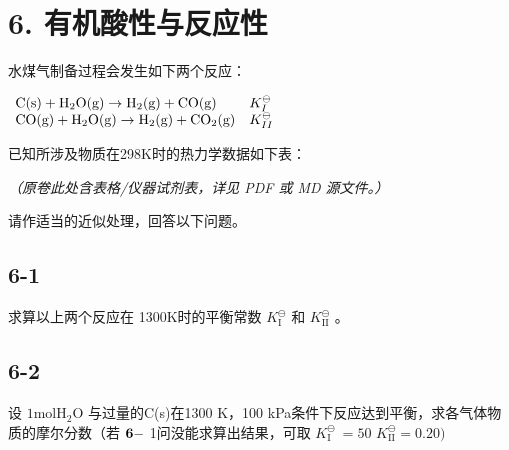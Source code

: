 \section*{6. 有机酸性与反应性}
⽔煤⽓制备过程会发⽣如下两个反应：

$
\begin{array}{l l}\mathrm {C(s)+ H_ {2} O(g)\rightarrow H_ {2} (g) + CO(g)}&K _ {I} ^ {\ominus}\\\mathrm {CO(g)+ H_ {2} O(g)\rightarrow H_ {2} (g) + CO_ {2} (g)}&K _ {I I} ^ {\ominus}\end{array}
$

已知所涉及物质在298K时的热⼒学数据如下表：

\textit{（原卷此处含表格/仪器试剂表，详见 PDF 或 MD 源文件。）}

请作适当的近似处理，回答以下问题。

\subsection*{6-1}
求算以上两个反应在 1300K时的平衡常数 $K _ { \mathrm { I } } ^ { \ominus }$ 和 $K _ { \mathrm { I I } } ^ { \ominus }$ 。

\subsection*{6-2}
设 $\mathrm { 1 m o l H _ { 2 } O }$ 与过量的C(s)在1300 K，100 kPa条件下反应达到平衡，求各⽓体物质的摩尔分数（若 ${ \bf 6 - }$ 1问没能求算出结果，可取 $K _ { \mathrm { I } } ^ { \ominus } \ = 5 0$ $K _ { \mathrm { I I } } ^ { \ominus } = 0 . 2 0 )$
